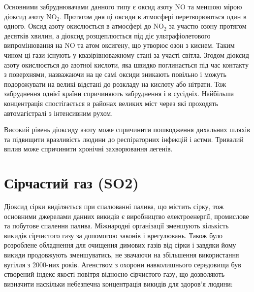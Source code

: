 \begin{center}
\end{center}

\vspace{0.75cm}



Основними забруднювачами данного типу є оксид азоту $\mathrm{NO}$ та меншою мірою 
діоксид азоту $\mathrm{NO}_2$. Протягом дня ці оксиди в атмосфері перетворюються один в одного. 
Оксид азоту окислюється в атмосфері до $\mathrm{NO}_2$ за участю озону протягом десятків 
хвилин, а діоксид розщеплюється під діє ультрафіолетового випромінювання на $\mathrm{NO}$ та 
атом оксигену, що утворює озон з киснем. Таким чином ці гази існують у квазірівноважному стані 
за участі світла. Згодом діоксид азоту окислюється до азотної кислоти, яка швидко поглинається 
під час контакту з поверхнями, назважаючи на це самі оксиди зникають повільно і 
можуть подорожувати на великі відстані до розкладу на кислоту або нітрати. Тож забруднення 
однієї країни спричиняють забруднення і в сусідніх. Найбільша концентрація 
спостігається в районах великих міст через які проходять автомагістралі з інтенсивним рухом.

Високий рівень діоксиду азоту може спричинити пошкодження дихальних шляхів та 
підвищити вразливість людини до респіраторних інфекцій і астми.
Тривалий вплив може спричинити хронічні захворювання легенів.


\section{Сірчастий газ (SO2)}

Діоксид сірки виділяється при спалюванні палива, що містить сірку, тож основними джерелами 
данних викидів є виробництво електроенергії, промислове та побутове спалення палива. Міжнародні 
організації зменшують кількість викидів сірчистого газу за допомогою законів і врегулювань. 
Також було розроблене обладнення для очищення димових газів від сірки і завдяки йому викиди 
продовжують зменшуватись, не звачаючи на збільшення використання вугілля з 2000-них років.
Агенством з охорони навколишнього середовища був створений індекс якості повітря відносно 
сірчистого газу, що дозволяють визначити наскільки небезпечна концентрація викидів для 
здоров'я людини:


